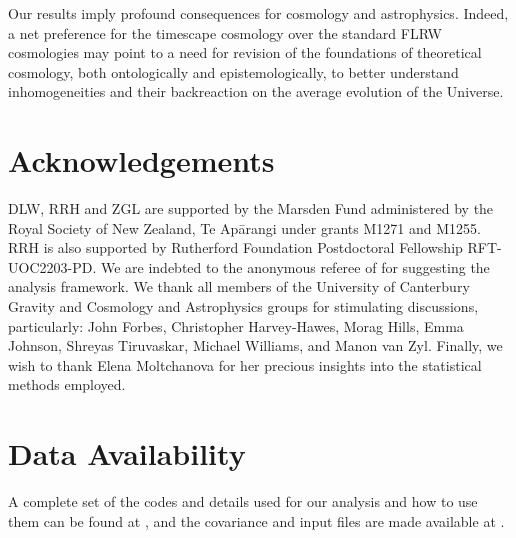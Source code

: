 \documentclass[fleqn,usenatbib,onecolumn,referee]{mnras}
\begin{document}
Our results imply profound consequences for cosmology and astrophysics. Indeed, a net preference for the timescape cosmology over the standard FLRW cosmologies may point to a need for revision of the foundations of theoretical cosmology, both ontologically and epistemologically, to better understand inhomogeneities and their backreaction on the average evolution of the Universe.

\section*{Acknowledgements}
DLW, RRH and ZGL are supported by the Marsden Fund administered by the Royal Society of New Zealand, Te Apārangi under grants M1271 and M1255. RRH is also supported by Rutherford Foundation Postdoctoral Fellowship RFT-UOC2203-PD. We are indebted to the anonymous referee of \citet{Lane_2023} for suggesting the analysis framework. We thank all members of the University of Canterbury Gravity and Cosmology and Astrophysics groups for stimulating discussions, particularly: John Forbes, Christopher Harvey-Hawes, Morag Hills, Emma Johnson, Shreyas Tiruvaskar, Michael Williams, and Manon van Zyl. Finally, we wish to thank Elena Moltchanova for her precious insights into the statistical methods employed.

\section*{Data Availability}

A complete set of the codes and details used for our analysis and how to use them can
be found at \citet{Seifert_2023}, and the covariance and input files are made available at \citet{Lane_2024}.





\bsp	
\label{lastpage}
\end{document}
